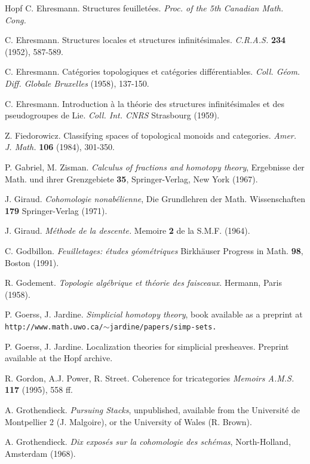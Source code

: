 \begin{thebibliography}{Hopf}
C. Ehresmann. Structures feuillet\'ees. {\em Proc. of the 5th
Canadian Math. Cong.}

C. Ehresmann. Structures locales et structures infinit\'esimales.
{\em C.R.A.S.} {\bf 234} (1952), 587-589.

C. Ehresmann. Cat\'egories topologiques et cat\'egories diff\'erentiables.
{\em Coll. G\'eom. Diff. Globale Bruxelles} (1958), 137-150.

C. Ehresmann. Introduction \`a la th\'eorie des structures
infinit\'esimales et des
pseudogroupes de Lie. {\em Coll. Int. CNRS} Strasbourg (1959).

Z. Fiedorowicz. Classifying spaces of topological monoids and categories.
{\em Amer. J. Math.} {\bf 106} (1984), 301-350.

P. Gabriel, M. Zisman. {\em Calculus of fractions and homotopy theory},
Ergebnisse der Math. und ihrer Grenzgebiete {\bf 35}, Springer-Verlag, New York
(1967).

J. Giraud. {\em Cohomologie nonab\'elienne}, Die Grundlehren der
Math. Wissen\-schaften {\bf 179} Springer-Verlag (1971).

J. Giraud. {\em M\'ethode de la descente.} Memoire {\bf 2} de la S.M.F.
(1964).

C. Godbillon. {\em Feuilletages: \'etudes g\'eom\'etriques}
Birkh\"auser Progress in Math. {\bf 98}, Boston (1991).

R. Godement. {\em Topologie alg\'ebrique et th\'eorie des faisceaux.}
Hermann, Paris (1958).

P. Goerss, J. Jardine. {\em Simplicial homotopy theory}, book available
as a preprint at {\tt
http://www.math.uwo.ca/}$\sim${\tt jardine/papers/simp-sets.}

P. Goerss, J. Jardine. Localization theories for simplicial presheaves. Preprint
available at the Hopf archive.

R. Gordon, A.J. Power, R. Street.  Coherence for tricategories {\em  Memoirs
A.M.S.} {\bf 117} (1995), 558 ff.

A. Grothendieck.  {\em Pursuing Stacks}, unpublished, available from the
Universit\'e de Montpellier 2 (J. Malgoire), or the University of Wales
(R. Brown).

A. Grothendieck.  {\em Dix expos\'es sur la cohomologie des sch\'emas},
North-Holland, Amsterdam (1968).


\end{thebibliography}
